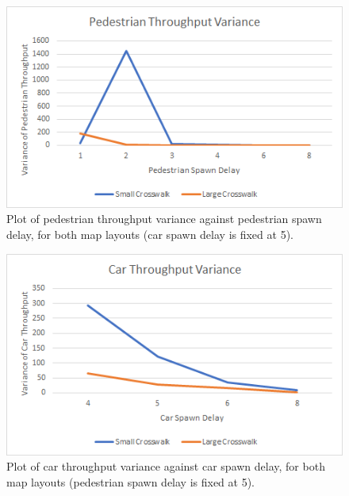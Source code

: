 \begin{figure}
    \label{fig:plot-pedestrian-variance}
    \centering
    \includegraphics[width=4.5in]{images/plot-pedestrian-variance.png}
    \caption{Plot of pedestrian throughput variance against pedestrian spawn delay, for both map layouts (car spawn delay is fixed at 5).}
\end{figure}

\begin{figure}
    \label{fig:plot-car-variance}
    \centering
    \includegraphics[width=4.5in]{images/plot-car-variance.png}
    \caption{Plot of car throughput variance against car spawn delay, for both map layouts (pedestrian spawn delay is fixed at 5).}
\end{figure}
